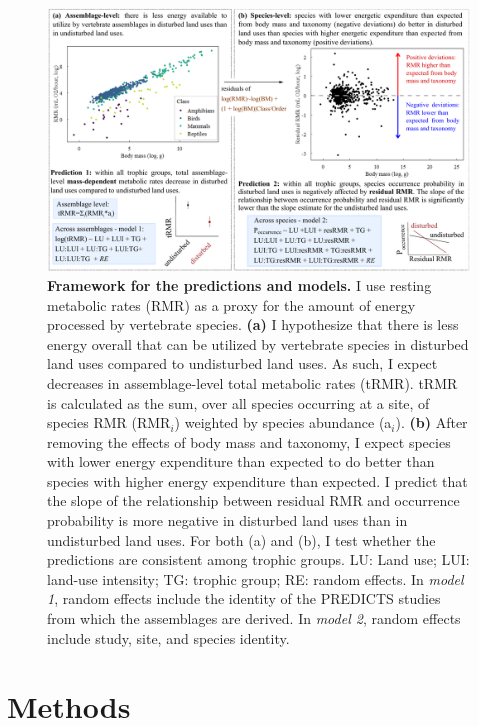 \begin{landscape}
\begin{figure}
\centering
\includegraphics[scale=0.75]{figures/Chapter5/Figure2_minorcorrections}
\caption[Framework for the predictions and models]{\textbf{Framework for the predictions and models.} I use resting metabolic rates (RMR) as a proxy for the amount of energy processed by vertebrate species. \textbf{(a)} I hypothesize that there is less energy overall that can be utilized by vertebrate species in disturbed land uses compared to undisturbed land uses. As such, I expect decreases in assemblage-level total metabolic rates (tRMR). tRMR is calculated as the sum, over all species occurring at a site, of species RMR (RMR$_i$) weighted by species abundance (a$_i$). \textbf{(b)} After removing the effects of body mass and taxonomy, I expect species with lower energy expenditure than expected to do better than species with higher energy expenditure than expected. I predict that the slope of the relationship between residual RMR and occurrence probability is more negative in disturbed land uses than in undisturbed land uses. For both (a) and (b), I test whether the predictions are consistent among trophic groups. LU: Land use; LUI: land-use intensity; TG: trophic group; RE: random effects. In \textit{model 1}, random effects include the identity of the PREDICTS studies from which the assemblages are derived. In \textit{model 2}, random effects include study, site, and species identity.}
\label{chap5_fig2}
\end{figure}
\end{landscape}


\clearpage

\section{Methods}


